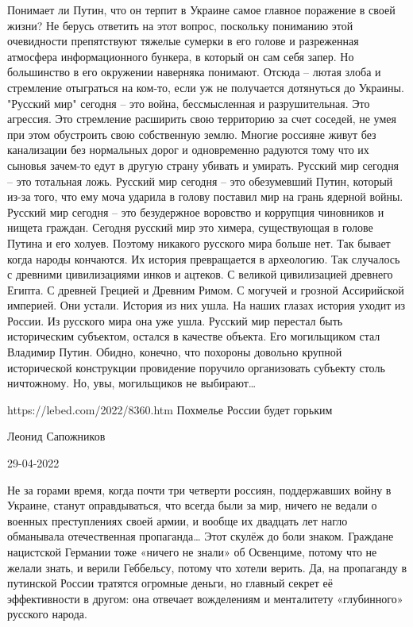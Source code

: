 Понимает ли Путин, что он терпит в Украине самое главное поражение в своей жизни? Не берусь ответить на этот вопрос, поскольку пониманию этой очевидности препятствуют тяжелые сумерки в его голове и разреженная атмосфера информационного бункера, в который он сам себя запер. Но большинство в его окружении наверняка понимают. Отсюда – лютая злоба и стремление отыграться на ком-то, если уж не получается дотянуться до Украины. "Русский мир" сегодня – это война, бессмысленная и разрушительная. Это агрессия. Это стремление расширить свою территорию за счет соседей, не умея при этом обустроить свою собственную землю. Многие россияне живут без канализации без нормальных дорог и одновременно радуются тому что их сыновья зачем-то едут в другую страну убивать и умирать.
Русский мир сегодня – это тотальная ложь.
Русский мир сегодня – это обезумевший Путин, который из-за того, что ему моча ударила в голову поставил мир на грань ядерной войны.
Русский мир сегодня – это безудержное воровство и коррупция чиновников и нищета граждан.
Сегодня русский мир это химера, существующая в голове Путина и его холуев.
Поэтому никакого русского мира больше нет. Так бывает когда народы кончаются. Их история превращается в археологию. Так случалось с древними цивилизациями инков и ацтеков. С великой цивилизацией древнего Египта. С древней Грецией и Древним Римом. С могучей и грозной Ассирийской империей. Они устали. История из них ушла. На наших глазах история уходит из России. Из русского мира она уже ушла. Русский мир перестал быть историческим субъектом, остался в качестве объекта.
Его могильщиком стал Владимир Путин. Обидно, конечно, что похороны довольно крупной исторической конструкции провидение поручило организовать субъекту столь ничтожному. Но, увы, могильщиков не выбирают…



https://lebed.com/2022/8360.htm
Похмелье России будет горьким

Леонид Сапожников

29-04-2022

Не за горами время, когда почти три четверти
россиян,
поддержавших войну в Украине, станут оправдываться, что всегда
были за мир,
ничего не ведали о военных преступлениях своей армии, и вообще их
двадцать лет
нагло обманывала отечественная пропаганда… Этот скулёж до боли
знаком. Граждане
нацистской Германии тоже «ничего не знали» об Освенциме, потому
что не желали
знать, и верили Геббельсу, потому что хотели верить. Да, на
пропаганду в
путинской России тратятся огромные деньги, но главный секрет её
эффективности в
другом: она отвечает вожделениям и менталитету «глубинного»
русского
народа. 


